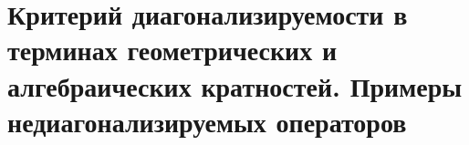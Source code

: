 \section{Критерий диагонализируемости в терминах геометрических и алгебраических кратностей. Примеры недиагонализируемых операторов}
